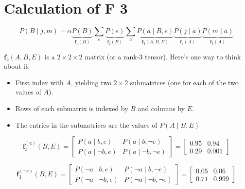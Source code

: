 \documentclass[11pt]{article}
\begin{document}
\section{Calculation of F 3}
\label{sec:org0b201c8}

\begin{equation*}
P(B \mid j, m) =
\alpha \underbrace{P(B)}_{\bm{f}_1(B)}
\sum_e
\underbrace{P(e)}_{\bm{f}_2(E)}
\sum_a
\underbrace{P(a \mid B, e)}_{\bm{f}_3(A,B,E)}
\underbrace{P(j \mid a)}_{\bm{f}_4(A)}
\underbrace{P(m \mid a)}_{\bm{f}_5(A)}
\end{equation*}

\(\bm{f}_3(A, B, E)\) is a \(2 \times 2 \times 2\) matrix (or a rank-3 tensor).  Here's one way to think about it:

\begin{itemize}
\item First index with \(A\), yielding two \(2 \times 2\) submatrices (one for each of the two values of \(A\)).
\item Rows of each submatrix is indexed by \(B\) and columns by \(E\).
\item The entries in the submatrices are the values of \(P(A \mid B, E)\)
\end{itemize}



\begin{equation*}
\bm{f}_{3}^{(a)} (B, E) =
\begin{bmatrix}
P(a \mid b,e) & P(a \mid b, \neg e) \\
P(a \mid \neg b, e) & P(a \mid \neg b, \neg e)
\end{bmatrix}
=
\begin{bmatrix}
0.95 & 0.94\\
0.29 & 0.001
\end{bmatrix}
\end{equation*}

\begin{equation*}
\bm{f}_{3}^{(\neg a)} (B, E) =
\begin{bmatrix}
P(\neg a \mid b,e) & P(\neg a \mid b, \neg e) \\
P(\neg a \mid \neg b, e) & P(\neg a \mid \neg b, \neg e)
\end{bmatrix}
=
\begin{bmatrix}
0.05 & 0.06\\
0.71 & 0.999
\end{bmatrix}
\end{equation*}
\end{document}
